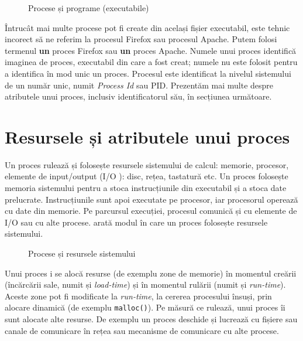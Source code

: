 \begin{figure}[!htbp]
  \centering
  \def\svgwidth{0.7\textwidth}
  
  \caption{Procese și programe (executabile)}
  \label{fig:process:exec}
\end{figure}

Întrucât mai multe procese pot fi create din același fișier executabil, este tehnic incorect să ne referim la procesul Firefox sau procesul Apache.
Putem folosi termenul \textbf{un} proces Firefox sau \textbf{un} proces Apache.
Numele unui proces identifică imaginea de proces, executabil din care a fost creat;
numele nu este folosit pentru a identifica în mod unic un proces.
Procesul este identificat la nivelul sistemului de un număr unic, numit \textit{Process Id} sau PID.
Prezentăm mai multe despre atributele unui proces, inclusiv identificatorul său, în secțiunea următoare.

\section{Resursele și atributele unui proces}
\label{sec:process:resources}

Un proces rulează și folosește resursele sistemului de calcul: memorie, procesor, elemente de input/output (I/O ): disc, rețea, tastatură etc.
Un proces folosește memoria sistemului pentru a stoca instrucțiunile din executabil și a stoca date prelucrate.
Instrucțiunile sunt apoi executate pe procesor, iar procesorul operează cu date din memorie.
Pe parcursul execuției, procesul comunică și cu elemente de I/O sau cu alte procese.
 arată modul în care un proces folosește resursele sistemului.

\begin{figure}[!htbp]
  \centering
  \def\svgwidth{0.8\textwidth}
  
  \caption{Procese și resursele sistemului}
  \label{fig:process:resources}
\end{figure}

Unui proces i se alocă resurse (de exemplu zone de memorie) în momentul creării (încărcării sale, numit și \textit{load-time}) și în momentul rulării (numit și \textit{run-time}).
Aceste zone pot fi modificate la \textit{run-time}, la cererea procesului însuși, prin alocare dinamică (de exemplu \texttt{malloc()}).
Pe măsură ce rulează, unui proces îi sunt alocate alte resurse.
De exemplu un proces deschide și lucrează cu fișiere sau canale de comunicare în rețea sau mecanisme de comunicare cu alte procese.

